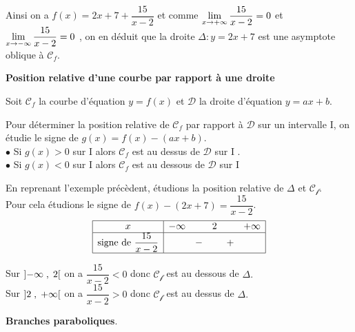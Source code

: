  Ainsi  on a  $ f(x)= 2x+7+\dfrac{15}{x-2}$  et comme  $\displaystyle\lim_{x\to +\infty}\dfrac{15}{x-2}  =0 $ et $ \displaystyle\lim_{x\to -\infty}\dfrac{15}{x-2}  =0 $ , on en déduit que la droite $\Delta:  y= 2x+7$  est une asymptote oblique  à  $ \mathscr{C}_{f}$.  

\textbf{Position relative d'une courbe par rapport à une droite}

Soit $\mathscr{C}_{f}$  la courbe d'équation  $ y=f(x) $  et  $\mathscr{D}$   la droite d'équation $ y=ax+b $.

Pour déterminer la position relative de $\mathscr{C}_{f}$   par rapport à  $\mathscr{D}$  sur un intervalle I, on étudie le signe de $ g(x)=f(x)-(ax+b). $\\

$ \bullet $  Si $ g(x)> 0 $ sur I alors $\mathscr{C}_{f}$  est au dessus de  $\mathscr{D}$  sur I .\\

$ \bullet $  Si $ g(x)< 0 $ sur I alors $\mathscr{C}_{f}$  est au dessous de  $\mathscr{D}$  sur I

\begin{example}


 En reprenant l'exemple précèdent,    étudions la position relative de $ \Delta $ et $ \mathcal{C_{f}} $.\\
Pour cela étudions le signe de $ f(x)-(2x+7) = \dfrac{15}{x-2} $. 
\[
\begin{array}{|c|ccccc|}
\hline
x & -\infty &        & 2      &        & +\infty \\
\hline
\text{signe de }\dfrac{15}{x-2} &        & -      &        & +      &        \\
\hline
\end{array}
\]

  Sur $ \left]-\infty \;,\; 2\right[ $  on  a  $\dfrac{15}{x-2} < 0  $ donc $ \mathcal{C_{f}} $ est au dessous de $ \Delta. $\\
  
   Sur $ \left]2 \;,\; +\infty\right[ $   on a $\dfrac{15}{x-2} > 0  $ donc $ \mathcal{C_{f}} $ est au dessus de $ \Delta. $

\end{example}

\textbf{Branches paraboliques}.

